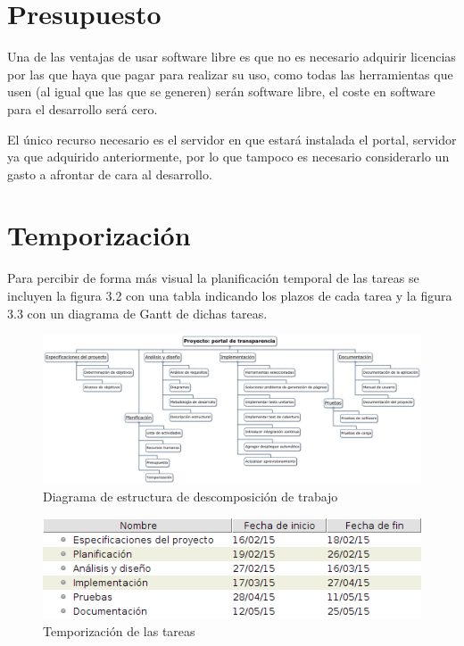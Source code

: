 \section{Presupuesto}

Una de las ventajas de usar software libre es que no es necesario adquirir licencias por las que haya que pagar para realizar su uso, como todas las herramientas que usen (al igual que las que se generen) serán software libre, el coste en software para el desarrollo será cero.

\bigskip

El único recurso necesario es el servidor en que estará instalada el portal, servidor ya que adquirido anteriormente, por lo que tampoco es necesario considerarlo un gasto a afrontar de cara al desarrollo.

\section{Temporización}

Para percibir de forma más visual la planificación temporal de las tareas se incluyen la figura 3.2 con una tabla indicando los plazos de cada tarea y la figura 3.3 con un diagrama de Gantt de dichas tareas.
\newpage

\begin{figure}[!ht]
  \begin{center}
    \includegraphics[scale=0.25,angle=90]{imagenes/diagrama_edt.png}
    \caption{Diagrama de estructura de descomposición de trabajo}
    \label{fig:diag_edt}
  \end{center}
\end{figure}

\newpage
\begin{figure}[!ht]
  \begin{center}
    \includegraphics[width=1\textwidth]{imagenes/tempo_tareas.png}
    \caption{Temporización de las tareas}
    \label{fig:tempo_tareas}
  \end{center}
\end{figure}

